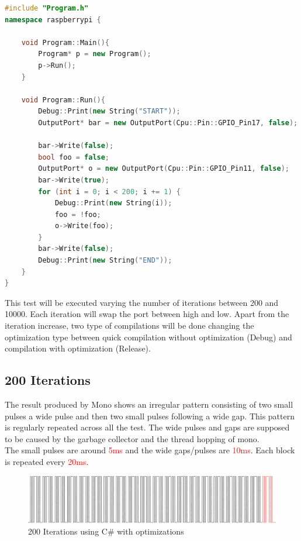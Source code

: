 \begin{lstlisting}[language=C++, caption={GPIO Performance translated to C++}]
#include "Program.h"
namespace raspberrypi {

	void Program::Main(){
		Program* p = new Program();
		p->Run();
	}

	void Program::Run(){
		Debug::Print(new String("START"));
		OutputPort* bar = new OutputPort(Cpu::Pin::GPIO_Pin17, false);
	
		bar->Write(false);
		bool foo = false;
		OutputPort* o = new OutputPort(Cpu::Pin::GPIO_Pin11, false);
		bar->Write(true);
		for (int i = 0; i < 200; i += 1) {
			Debug::Print(new String(i));
			foo = !foo;
			o->Write(foo);
		}
		bar->Write(false);
		Debug::Print(new String("END"));
	}
}
\end{lstlisting}

This test will be executed varying the number of iterations between 200 and 10000. Each iteration will swap the port between high and low. Apart from the iteration increase, two type of compilations will be done changing the optimization type between quick compilation without optimization (Debug) and compilation with optimization (Release).

\subsection{200 Iterations}\label{SS:200-iterations}
The result produced by Mono shows an irregular pattern consisting of two small pulses a wide pulse and then two small pulses following a wide gap. This pattern is regularly repeated across all the test. The wide pulses and gaps are supposed to be caused by the garbage collector and the thread hopping of mono.
\\
The small pulses are around \textcolor{red}{5ms} and the wide gaps/pulses are \textcolor{red}{10ms}. Each block is repeated every \textcolor{red}{20ms}.

\begin{figure}[H]\begin{center}
 \centering
  \captionsetup{justification=centering}
  \includegraphics[width=1\textwidth]{pictures/performance-tests/GPIO/200/csharp}
  \caption{200 Iterations using C\# with optimizations \label{fig:gpio-200it-csharp}}
\end{center}\end{figure}

